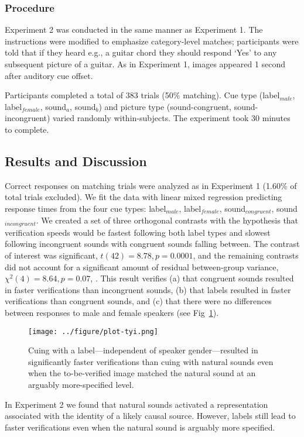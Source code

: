 \documentclass[12pt, titlepage]{article}
\begin{document}
\subsubsection*{Procedure}
Experiment 2 was conducted in the same manner as Experiment 1. The instructions were modified to emphasize category-level matches; participants were told that if they heard e.g., a guitar chord they should respond `Yes' to any subsequent picture of a guitar. As in Experiment 1, images appeared 1 second after auditory cue offset.

Participants completed a total of 383 trials (50\% matching). Cue type (label$_{male}$, lab\-el$_{female}$, sound$_{a}$, sound$_{b}$) and picture type (sound-congruent, sound-incongruent) varied randomly within-subjects. The experiment took 30 minutes to complete.

\subsection{Results and Discussion}
Correct responses on matching trials were analyzed as in Experiment 1 (1.60\% of total trials excluded). We fit the data with linear mixed regression predicting response times from the four cue types: label$_{male}$, label$_{female}$, sound$_{congruent}$, sound$_{incongruent}$. We created a set of three orthogonal contrasts with the hypothesis that verification speeds would be fastest following both label types and slowest following incongruent sounds with congruent sounds falling between. The contrast of interest was significant, $t(42)=8.78, p=0.0001$, and the remaining contrasts did not account for a significant amount of residual between-group variance, $\chi^2(4)=8.64, p=0.07$, \cite{Abelson:1997vx}. This result verifies (a) that congruent sounds resulted in faster verifications than incongruent sounds, (b) that labels resulted in faster verifications than congruent sounds, and (c) that there were no differences between responses to male and female speakers (see Fig~\ref{fig:tyi}).

\begin{figure}[h!]
	\centering
	\caption{Cuing with a label---independent of speaker gender---resulted in significantly faster verifications than cuing with natural sounds even when the to-be-verified image matched the natural sound at an arguably more-specified level.}
	\label{fig:tyi}
	\texttt{[image: ../figure/plot-tyi.png]}
\end{figure}

In Experiment 2 we found that natural sounds activated a representation associated with the identity of a likely causal source. However, labels still lead to faster verifications even when the natural sound is arguably more specified.
\end{document}
